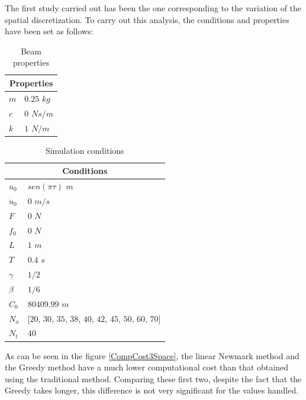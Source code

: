 \documentclass{ws-m3as}
\begin{document}

The first study carried out has been the one corresponding to the variation of the spatial discretization. To carry out this analysis, the conditions and properties have been set as follows:

\begin{table}[htb]
\centering
\caption{Beam properties}
\label{tabla:propiedadesSpace}
\begin{tabular}{|l|l|}
\hline
\multicolumn{2}{|c|}{Properties} \\ \hline
$m$ & $0.25$ $kg$ \\
$c$ & $0$ $N s/m$\\
$k$ & $1$ $N/m$\\
\hline
\end{tabular}
\end{table}


\begin{table}[htb]
\centering
\caption{Simulation conditions}
\label{tabla:condicionesSpace}
\begin{tabular}{|l|l|}
\hline
\multicolumn{2}{|c|}{Conditions} \\ \hline
$u_0$ & $sen(\pi \tau)$ $m$ \\
$\dot{u}_0$ & $0$ $m/s$\\
$F$ & $0$ $N$\\
$f_0$ & $0$ $N$\\
$L$ & $1$ $m$\\
$T$ & $0.4$ $s$\\
$\gamma$ & $1/2$\\
$\beta$ & $1/6$ \\
$C_0$ & $80409.99$ $m$ \\
$N_x$ & [$20$, $30$, $35$, $38$, $40$, $42$, $45$, $50$, $60$, $70$]  \\
$N_t$ & $40$  \\
\hline
\end{tabular}
\end{table}


As can be seen in the figure \ref{CompCost3Space}, the linear Newmark method and the Greedy method have a much lower computational cost than that obtained using the traditional method. Comparing these first two, despite the fact that the Greedy takes longer, this difference is not very significant for the values handled.
\end{document}
